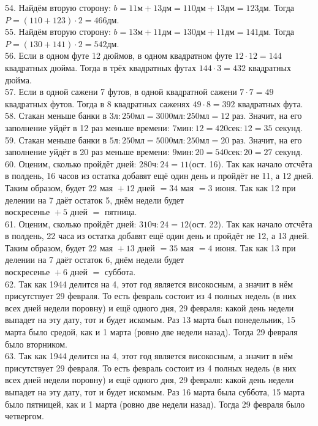 \documentclass[12pt]{article}
\begin{document}
54. Найдём вторую сторону: $b=11\text{м}+13\text{дм}=110\text{дм}+13\text{дм}=123$дм. Тогда $P=(110+123)\cdot2=466$дм.\\
55. Найдём вторую сторону: $b=13\text{м}+11\text{дм}=130\text{дм}+11\text{дм}=141$дм. Тогда $P=(130+141)\cdot2=542$дм.\\
56. Если в одном футе 12 дюймов, в одном квадратном футе $12\cdot12=144$ квадратных дюйма. Тогда в трёх квадратных футах $144\cdot3=432$ квадратных дюйма.\\
57. Если в одной сажени 7 футов, в одной квадратной сажени $7\cdot7=49$ квадратных футов. Тогда в 8 квадратных саженях $49\cdot8=392$ квадратных фута.\\
58. Стакан меньше банки в $3\text{л}:250\text{мл}=3000\text{мл}:250\text{мл}=12$ раз. Значит, на его заполнение уйдёт в 12 раз меньше времени: $7\text{мин}:12=420\text{сек}:12=35$ секунд.\\
59. Стакан меньше банки в $5\text{л}:250\text{мл}=5000\text{мл}:250\text{мл}=20$ раз. Значит, на его заполнение уйдёт в 20 раз меньше времени: $9\text{мин}:20=540\text{сек}:20=27$ секунд.\\
60. Оценим, сколько пройдёт дней: $280\text{ч}:24=11$(ост. 16). Так как начало отсчёта в полдень, 16 часов из остатка добавят ещё один день и пройдёт не 11, а 12 дней. Таким образом, будет $22\text{ мая }+12\text{ дней }=34\text{ мая }=3\text{ июня}.$ Так как 12 при делении на 7 даёт остаток 5, днём недели будет $\text{воскресенье }+5\text{ дней }=\text{ пятница.}$\\
61. Оценим, сколько пройдёт дней: $310\text{ч}:24=12$(ост. 22). Так как начало отсчёта в полдень, 22 часа из остатка добавят ещё один день и пройдёт не 12, а 13 дней. Таким образом, будет $22\text{ мая }+13\text{ дней }=35\text{ мая }=4\text{ июня}.$ Так как 13 при делении на 7 даёт остаток 6, днём недели будет $\text{воскресенье }+6\text{ дней }=\text{ суббота.}$\\
62. Так как 1944 делится на 4, этот год является високосным, а значит в нём присутствует 29 февраля. То есть февраль состоит из 4 полных недель (в них всех дней недели поровну) и ещё одного дня, 29 февраля: какой день недели выпадет на эту дату, тот и будет искомым. Раз 13 марта был понедельник, 15 марта было средой, как и 1 марта (ровно две недели назад). Тогда 29 февраля было вторником.\\
63. Так как 1944 делится на 4, этот год является високосным, а значит в нём присутствует 29 февраля. То есть февраль состоит из 4 полных недель (в них всех дней недели поровну) и ещё одного дня, 29 февраля: какой день недели выпадет на эту дату, тот и будет искомым. Раз 16 марта была суббота, 15 марта было пятницей, как и 1 марта (ровно две недели назад). Тогда 29 февраля было четвергом.\\
\end{document}
